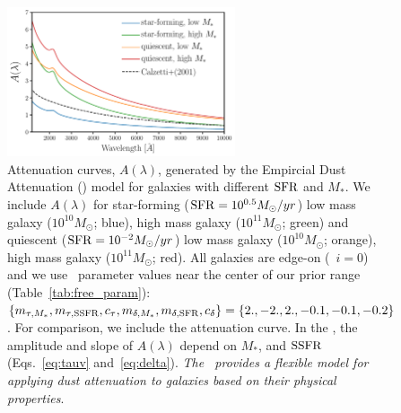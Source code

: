 \begin{figure}
\begin{center}
    \includegraphics[width=0.6\textwidth]{figs/dems.pdf}
    \caption{\label{fig:dem_av}
    Attenuation curves, $A(\lambda)$, generated by the Empircial Dust Attenuation (\eda)
    model for galaxies with different ${\rm SFR}$ and $M_*$. We include $A(\lambda)$ for 
    star-forming (${\rm SFR}=10^{0.5}M_\odot/yr$) low mass galaxy ($10^{10}M_\odot$;
    blue), high mass galaxy ($10^{11}M_\odot$; green) and quiescent
    (${\rm SFR}=10^{-2}M_\odot/yr$) low mass galaxy ($10^{10}M_\odot$; orange), 
    high mass galaxy ($10^{11}M_\odot$; red). All galaxies are edge-on
    (\ie~$i=0$) and we use \eda~parameter values near the center of our prior
    range (Table~\ref{tab:free_param}):$\{m_{\tau,M_*}, m_{\tau,{\rm SSFR}}, c_\tau, m_{\delta,M_*},
    m_{\delta,{\rm SFR}}, c_\delta\} = \{2., -2., 2., -0.1, -0.1, -0.2\}$. For comparison, 
    we include the \cite{calzetti2001} attenuation curve. In the \eda, the
    amplitude and slope of $A(\lambda)$ depend on $M_*$, and ${\rm SSFR}$ (Eqs.~\ref{eq:tauv}
    and~\ref{eq:delta}). {\em The \eda~provides a flexible model for
    applying dust attenuation to galaxies based on their physical properties}.
    } 
\end{center}
\end{figure}


